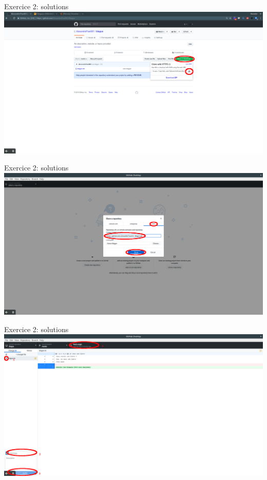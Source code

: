 \documentclass{beamer}
\begin{document}
\begin{frame}{Exercice 2: solutions}
	\centering
    \includegraphics[width=\textwidth]{img/image_exercices/get_url_all_time.png}
\end{frame}

\begin{frame}{Exercice 2: solutions}
    \centering
    \includegraphics[width=\textwidth]{img/image_exercices/cloning_with_url.png}
\end{frame}

\begin{frame}{Exercice 2: solutions}
    \centering
    \includegraphics[width=\textwidth]{img/image_exercices/fetch_for_merge.png}
\end{frame}
\end{document}
